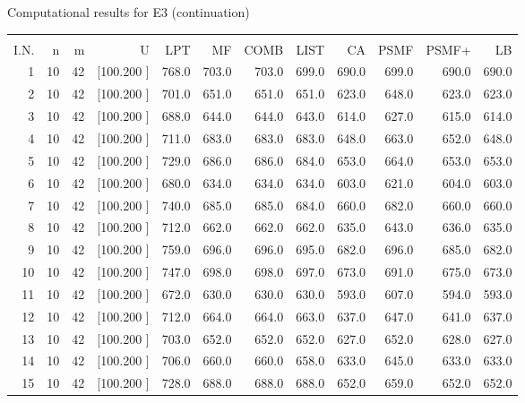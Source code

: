 \documentclass[12pt,a4paper]{article}
\begin{document}
\newpage
\begin{center}
 Computational results for E3 (continuation) {\tiny
\begin{tabular}{r r r r r r r r r r r r}\hline
    &   &   &          &        &        &        &        &        &        &        &       \\[-0.1in]
  I.N.  &  n  &  m  &  U  &  LPT  &  MF  &  COMB  &  LIST  &  CA  & PSMF &PSMF+ & LB \\[0.03in]
\hline
   1& 10& 42&[100.200   ]&   768.0&   703.0&   703.0&   699.0&   690.0&   699.0&   690.0&   690.0\\[-0.02in]
   2& 10& 42&[100.200   ]&   701.0&   651.0&   651.0&   651.0&   623.0&   648.0&   623.0&   623.0\\[-0.02in]
   3& 10& 42&[100.200   ]&   688.0&   644.0&   644.0&   643.0&   614.0&   627.0&   615.0&   614.0\\[-0.02in]
   4& 10& 42&[100.200   ]&   711.0&   683.0&   683.0&   683.0&   648.0&   663.0&   652.0&   648.0\\[-0.02in]
   5& 10& 42&[100.200   ]&   729.0&   686.0&   686.0&   684.0&   653.0&   664.0&   653.0&   653.0\\[-0.02in]
   6& 10& 42&[100.200   ]&   680.0&   634.0&   634.0&   634.0&   603.0&   621.0&   604.0&   603.0\\[-0.02in]
   7& 10& 42&[100.200   ]&   740.0&   685.0&   685.0&   684.0&   660.0&   682.0&   660.0&   660.0\\[-0.02in]
   8& 10& 42&[100.200   ]&   712.0&   662.0&   662.0&   662.0&   635.0&   643.0&   636.0&   635.0\\[-0.02in]
   9& 10& 42&[100.200   ]&   759.0&   696.0&   696.0&   695.0&   682.0&   696.0&   685.0&   682.0\\[-0.02in]
  10& 10& 42&[100.200   ]&   747.0&   698.0&   698.0&   697.0&   673.0&   691.0&   675.0&   673.0\\[-0.02in]
  11& 10& 42&[100.200   ]&   672.0&   630.0&   630.0&   630.0&   593.0&   607.0&   594.0&   593.0\\[-0.02in]
  12& 10& 42&[100.200   ]&   712.0&   664.0&   664.0&   663.0&   637.0&   647.0&   641.0&   637.0\\[-0.02in]
  13& 10& 42&[100.200   ]&   703.0&   652.0&   652.0&   652.0&   627.0&   652.0&   628.0&   627.0\\[-0.02in]
  14& 10& 42&[100.200   ]&   706.0&   660.0&   660.0&   658.0&   633.0&   645.0&   633.0&   633.0\\[-0.02in]
  15& 10& 42&[100.200   ]&   728.0&   688.0&   688.0&   688.0&   652.0&   659.0&   652.0&   652.0\\[-0.02in]

\end{tabular}}
\end{center}
\end{document}
